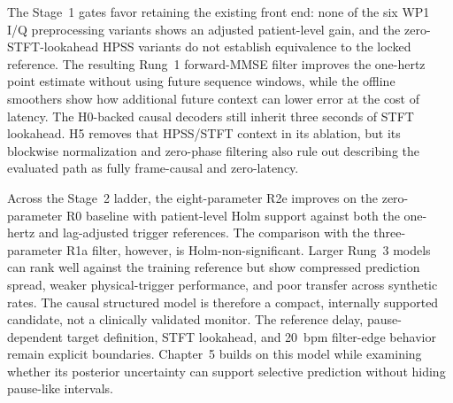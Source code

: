 The Stage~1 gates favor retaining the existing front end: none of the six WP1 I/Q preprocessing
variants shows an adjusted patient-level gain, and the zero-STFT-lookahead HPSS variants do not
establish equivalence to the locked reference. The resulting Rung~1 forward-MMSE filter improves
the one-hertz point estimate without using future sequence windows, while the offline smoothers
show how additional future context can lower error at the cost of latency. The H0-backed causal
decoders still inherit three seconds of STFT lookahead. H5 removes that HPSS/STFT context in its
ablation, but its blockwise normalization and zero-phase filtering also rule out describing the
evaluated path as fully frame-causal and zero-latency.

Across the Stage~2 ladder, the eight-parameter R2e improves on the zero-parameter R0 baseline
with patient-level Holm support against both the one-hertz and lag-adjusted trigger references.
The comparison with the three-parameter R1a filter, however, is Holm-non-significant. Larger
Rung~3 models can rank well against the training reference but show compressed prediction spread,
weaker physical-trigger performance, and poor transfer across synthetic rates. The causal
structured model is therefore a compact, internally supported candidate, not a clinically
validated monitor. The reference delay, pause-dependent target definition, STFT lookahead, and
20~bpm filter-edge behavior remain explicit boundaries. Chapter~5 builds on this model while
examining whether its posterior uncertainty can support selective prediction without hiding
pause-like intervals.
